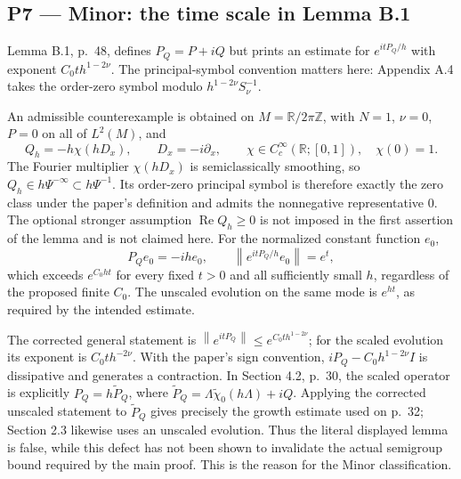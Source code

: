 \documentclass[10pt]{article}
\begin{document}
\subsection*{P7 — Minor: the time scale in Lemma B.1}
Lemma B.1, p. 48, defines \(P_Q=P+iQ\) but prints an estimate for \(e^{itP_Q/h}\) with exponent \(C_0th^{1-2\nu}\). The principal-symbol convention matters here: Appendix A.4 takes the order-zero symbol modulo \(h^{1-2\nu}S_\nu^{-1}\).\par
An admissible counterexample is obtained on \(M=\mathbb R/2\pi\mathbb Z\), with \(N=1\), \(\nu=0\), \(P=0\) on all of \(L^2(M)\), and \[Q_h=-h\chi(hD_x),\qquad D_x=-i\partial_x,\qquad
 \chi\in C^\infty_c(\mathbb R;[0,1]),\quad \chi(0)=1 .\] The Fourier multiplier \(\chi(hD_x)\) is semiclassically smoothing, so \(Q_h\in h\Psi^{-\infty}\subset h\Psi^{-1}\). Its order-zero principal symbol is therefore exactly the zero class under the paper’s definition and admits the nonnegative representative \(0\). The optional stronger assumption \(\operatorname{Re}Q_h\geq0\) is not imposed in the first assertion of the lemma and is not claimed here. For the normalized constant function \(e_0\), \[P_Qe_0=-ih e_0,\qquad
 \left\|e^{itP_Q/h}e_0\right\|=e^t,\] which exceeds \(e^{C_0ht}\) for every fixed \(t>0\) and all sufficiently small \(h\), regardless of the proposed finite \(C_0\). The unscaled evolution on the same mode is \(e^{ht}\), as required by the intended estimate.\par
The corrected general statement is \(\left\|e^{itP_Q}\right\|\leq e^{C_0th^{1-2\nu}}\); for the scaled evolution its exponent is \(C_0th^{-2\nu}\). With the paper’s sign convention, \(iP_Q-C_0h^{1-2\nu}I\) is dissipative and generates a contraction. In Section 4.2, p. 30, the scaled operator is explicitly \(P_Q=h\widetilde P_Q\), where \(\widetilde P_Q=\Lambda\widetilde\chi_0(h\Lambda)+iQ\). Applying the corrected unscaled statement to \(\widetilde P_Q\) gives precisely the growth estimate used on p. 32; Section 2.3 likewise uses an unscaled evolution. Thus the literal displayed lemma is false, while this defect has not been shown to invalidate the actual semigroup bound required by the main proof. This is the reason for the Minor classification.\par
\end{document}
